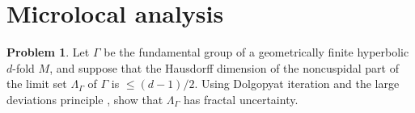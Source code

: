 \documentclass[reqno,11pt]{amsart}
\theoremstyle{definition}
\newtheorem{problem}[theorem]{Problem}
\numberwithin{equation}{section}
\begin{document}
\section{Microlocal analysis}
\begin{problem}
Let $\Gamma$ be the fundamental group of a geometrically finite hyperbolic $d$-fold $M$, and suppose that the Hausdorff dimension of the noncuspidal part of the limit set $\Lambda_\Gamma$ of $\Gamma$ is $\leq (d - 1)/2$.
Using Dolgopyat iteration and the large deviations principle \cite{Li_2022}, show that $\Lambda_\Gamma$ has fractal uncertainty.
\end{problem}


\printbibliography
\end{document}
